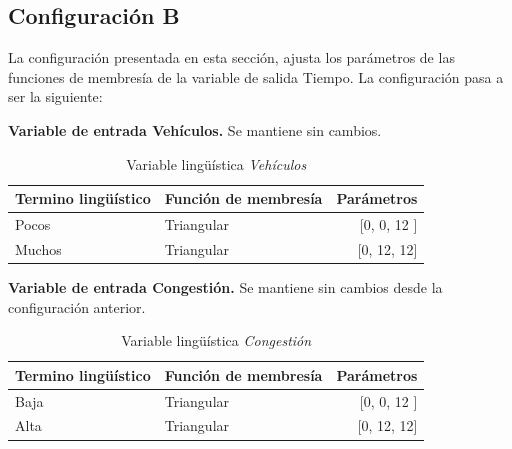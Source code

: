  


\pagebreak
\subsection{Configuración B}
La configuración presentada en esta sección, ajusta los parámetros de las funciones de membresía de la variable de salida Tiempo. La configuración pasa a ser la siguiente: 

\textbf{Variable de entrada Vehículos.} Se mantiene sin cambios.

\begin{table}[!h]
	\centering
	\begin{tabular}{llr} \toprule
		Termino lingüístico & Función de membresía & Parámetros \\ \midrule
		Pocos & Triangular & [0, 0, 12 ] \\
		Muchos & Triangular & [0, 12, 12] \\ \bottomrule
	\end{tabular}
	\caption[Variable lingüística \textit{Vehículos} (configuración \textit{B})]{Variable lingüística \textit{Vehículos}}
\end{table}


\textbf{Variable de entrada Congestión.} Se mantiene sin cambios desde la configuración anterior.


\begin{table}[!h]
	\centering
	\begin{tabular}{llr} \toprule
		Termino lingüístico & Función de membresía & Parámetros \\ \midrule
		Baja & Triangular & [0, 0, 12 ] \\
		Alta & Triangular & [0, 12, 12] \\ \bottomrule
	\end{tabular}
	\caption[Variable lingüística \textit{Congestión} (configuración \textit{B})]{Variable lingüística \textit{Congestión}}
\end{table}

